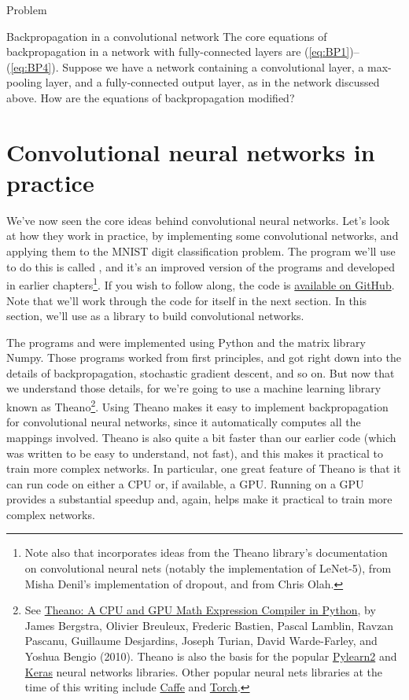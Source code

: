 \documentclass[a4paper,twoside,10pt]{book}
\begin{document}
\begin{exercize}{Problem}
	\item Backpropagation in a convolutional network The core equations of backpropagation in a network with fully-connected layers are (\ref{eq:BP1})--(\ref{eq:BP4}). Suppose we have a network containing a convolutional layer, a max-pooling layer, and a fully-connected output layer, as in the network discussed above. How are the equations of backpropagation modified?
\end{exercize}
\section{Convolutional neural networks in practice}
We've now seen the core ideas behind convolutional neural networks. Let's look at how they work in practice, by implementing some convolutional networks, and applying them to the MNIST digit classification problem. The program we'll use to do this is called , and it's an improved version of the programs  and  developed in earlier chapters\footnote{Note also that  incorporates ideas from the Theano library's documentation on convolutional neural nets (notably the implementation of LeNet-5), from Misha Denil's implementation of dropout, and from Chris Olah.}. If you wish to follow along, the code is \href{https://github.com/mnielsen/neural-networks-and-deep-learning/blob/master/src/network3.py}{available on GitHub}. Note that we'll work through the code for  itself in the next section. In this section, we'll use  as a library to build convolutional networks.

The programs  and  were implemented using Python and the matrix library Numpy. Those programs worked from first principles, and got right down into the details of backpropagation, stochastic gradient descent, and so on. But now that we understand those details, for  we're going to use a machine learning library known as Theano\footnote{See \href{http://www.iro.umontreal.ca/~lisa/pointeurs/theano_scipy2010.pdf}{Theano: A CPU and GPU Math Expression Compiler in Python}, by James Bergstra, Olivier Breuleux, Frederic Bastien, Pascal Lamblin, Ravzan Pascanu, Guillaume Desjardins, Joseph Turian, David Warde-Farley, and Yoshua Bengio (2010). Theano is also the basis for the popular \href{http://deeplearning.net/software/pylearn2/}{Pylearn2} and \href{http://keras.io/}{Keras} neural networks libraries. Other popular neural nets libraries at the time of this writing include \href{http://caffe.berkeleyvision.org/}{Caffe} and \href{http://torch.ch/}{Torch}.}. Using Theano makes it easy to implement backpropagation for convolutional neural networks, since it automatically computes all the mappings involved. Theano is also quite a bit faster than our earlier code (which was written to be easy to understand, not fast), and this makes it practical to train more complex networks. In particular, one great feature of Theano is that it can run code on either a CPU or, if available, a GPU. Running on a GPU provides a substantial speedup and, again, helps make it practical to train more complex networks.
\end{document}
